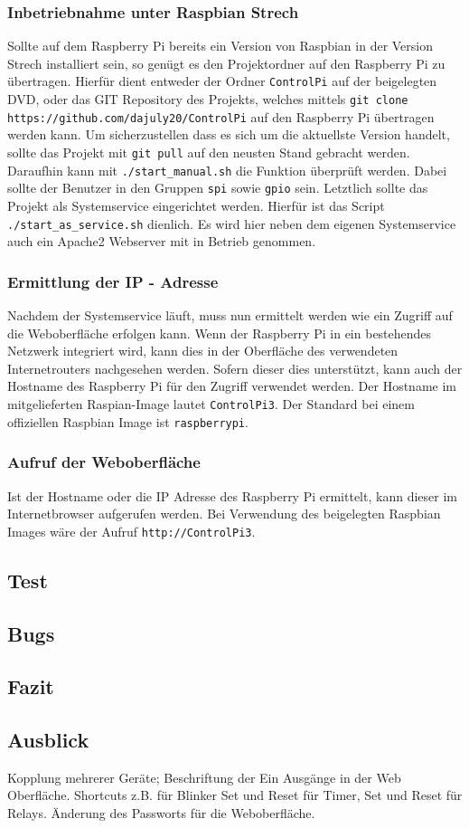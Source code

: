  \subsubsection{Inbetriebnahme unter Raspbian Strech}
 Sollte auf dem Raspberry Pi bereits ein Version von Raspbian in der Version Strech installiert sein, so genügt es den Projektordner auf den Raspberry Pi zu übertragen. Hierfür dient entweder der Ordner \texttt{ControlPi} auf der beigelegten DVD, oder das GIT Repository des Projekts, welches mittels  \texttt{git clone https://github.com/dajuly20/ControlPi} auf den Raspberry Pi übertragen werden kann. Um sicherzustellen dass es sich um die aktuellste Version handelt, sollte das Projekt mit \texttt{git pull} auf den neusten Stand gebracht werden. Daraufhin kann mit \texttt{./start\_manual.sh} die Funktion überprüft werden. Dabei sollte der Benutzer in den Gruppen \texttt{spi} sowie \texttt{gpio} sein. Letztlich sollte das Projekt als Systemservice eingerichtet werden. Hierfür ist das Script \texttt{./start\_as\_service.sh} dienlich. Es wird hier neben dem eigenen Systemservice auch ein Apache2 Webserver mit in Betrieb genommen.
 \subsubsection{Ermittlung der IP - Adresse}
 Nachdem der Systemservice läuft, muss nun ermittelt werden wie ein Zugriff auf die Weboberfläche erfolgen kann. Wenn der Raspberry Pi in ein bestehendes Netzwerk integriert wird, kann dies in der Oberfläche des verwendeten Internetrouters nachgesehen werden. Sofern dieser dies unterstützt, kann auch der Hostname des Raspberry Pi für den Zugriff verwendet werden. Der Hostname im mitgelieferten Raspian-Image lautet \texttt{ControlPi3}. Der Standard bei einem offiziellen Raspbian Image ist \texttt{raspberrypi}. 
 \subsubsection{Aufruf der Weboberfläche}
 Ist der Hostname oder die IP Adresse des Raspberry Pi ermittelt, kann dieser im Internetbrowser aufgerufen werden. Bei Verwendung des beigelegten Raspbian Images wäre der Aufruf \texttt{http://ControlPi3}.
 \subsection{Test}
 
 \subsection{Bugs}
 \subsection{Fazit}
 \subsection{Ausblick}
 Kopplung mehrerer Geräte;
 Beschriftung der Ein Ausgänge in der Web Oberfläche. 
 Shortcuts z.B. für Blinker
 Set und Reset für Timer,
 Set und Reset für Relays.
 Änderung des Passworts für die Weboberfläche.
 
 
 
\clearpage